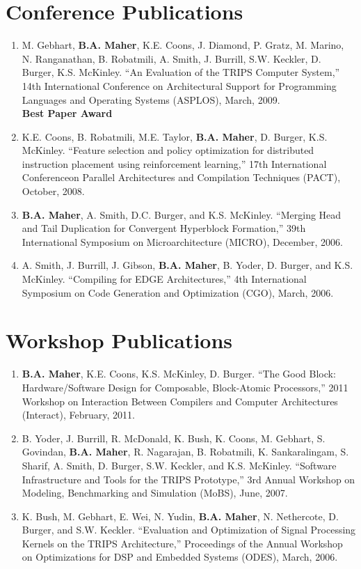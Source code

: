 \documentclass[11pt]{article}
\begin{document}
\section{Conference Publications}
\begin{enumerate}

\item M. Gebhart, \textbf{B.A. Maher}, K.E. Coons, J. Diamond, P. Gratz, M. Marino, N. Ranganathan, B. Robatmili, A. Smith, J. Burrill, S.W. Keckler, D. Burger, K.S. McKinley.  ``An Evaluation of the TRIPS Computer System,''  14th International Conference on Architectural Support for Programming Languages and Operating Systems (ASPLOS), March, 2009.\\
\textbf{Best Paper Award}

\item K.E. Coons, B. Robatmili, M.E. Taylor, \textbf{B.A. Maher}, D. Burger, K.S. McKinley.  ``Feature selection and policy optimization for distributed instruction placement using reinforcement learning,'' 17th International Conferenceon Parallel Architectures and Compilation Techniques (PACT), October, 2008.

\item \textbf{B.A. Maher}, A. Smith, D.C. Burger, and K.S. McKinley.  ``Merging Head and Tail Duplication for Convergent Hyperblock Formation,'' 39th International Symposium on Microarchitecture (MICRO), December, 2006.

\item A. Smith, J. Burrill, J. Gibson, \textbf{B.A. Maher}, B. Yoder, D. Burger, and K.S. McKinley.  ``Compiling for EDGE Architectures,'' 4th International Symposium on Code Generation and Optimization (CGO), March, 2006.

\end{enumerate}

\section{Workshop Publications}
\begin{enumerate}

\item \textbf{B.A. Maher}, K.E. Coons, K.S. McKinley, D. Burger.  ``The Good Block: Hardware/Software Design for Composable, Block-Atomic Processors,'' 2011 Workshop on Interaction Between Compilers and Computer Architectures (Interact), February, 2011.
\item B. Yoder, J. Burrill, R. McDonald, K. Bush, K. Coons, M. Gebhart, S. Govindan, \textbf{B.A. Maher}, R. Nagarajan, B. Robatmili, K. Sankaralingam, S. Sharif, A. Smith, D. Burger, S.W. Keckler, and K.S. McKinley. ``Software Infrastructure and Tools for the TRIPS Prototype,'' 3rd Annual Workshop on Modeling, Benchmarking and Simulation (MoBS), June, 2007.

\item K. Bush, M. Gebhart, E. Wei, N. Yudin, \textbf{B.A. Maher}, N. Nethercote, D. Burger, and S.W. Keckler. ``Evaluation and Optimization of Signal Processing Kernels on the TRIPS Architecture,'' Proceedings of the Annual Workshop on Optimizations for DSP and Embedded Systems (ODES), March, 2006.

\end{enumerate}
\end{document}

